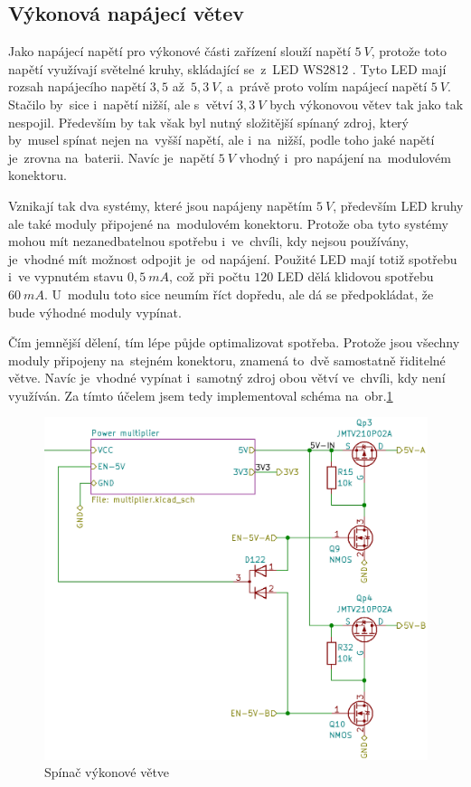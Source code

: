 \subsection{Výkonová napájecí větev}
Jako napájecí napětí pro výkonové části zařízení slouží napětí \(5~V\), protože toto napětí využívají světelné kruhy, skládající se~z~LED WS2812 \cite{WS2812B}.
Tyto LED mají rozsah napájecího napětí \(3,5\) až~\(5,3~V\), a~právě proto volím napájecí napětí \(5~V\).
Stačilo by~sice i~napětí nižší, ale s~větví \(3,3~V\) bych výkonovou větev tak jako tak nespojil.
Především by tak však byl nutný složitější spínaný zdroj, který by~musel spínat nejen na~vyšší napětí, ale i~na~nižší, podle toho jaké napětí je~zrovna na~baterii.
Navíc je~napětí \(5~V\) vhodný i~pro napájení na~modulovém konektoru.

Vznikají tak dva systémy, které jsou napájeny napětím \(5~V\), především LED kruhy ale také moduly připojené na~modulovém konektoru.
Protože oba tyto systémy mohou mít nezanedbatelnou spotřebu i~ve~chvíli, kdy nejsou používány, je~vhodné mít možnost odpojit je~od napájení.
Použité LED mají totiž spotřebu i~ve vypnutém stavu \(0,5~mA\), což při počtu \(120\) LED dělá klidovou spotřebu \(60~mA\).
U~modulu toto sice neumím říct dopředu, ale dá se předpokládat, že bude výhodné moduly vypínat.

Čím jemnější dělení, tím lépe půjde optimalizovat spotřeba.
Protože jsou všechny moduly připojeny na~stejném konektoru, znamená to~dvě samostatně řiditelné větve.
Navíc je~vhodné vypínat i~samotný zdroj obou větví ve~chvíli, kdy není využíván.
Za tímto účelem jsem tedy implementoval schéma na~obr.\ref{fig:spinac_vikonove_vetve}

\begin{figure}[h!]
    \centering
    \includegraphics[width=\textwidth]{text/PraktickaCast/img/spinac_vikonove_vetve.png}
    \caption{Spínač výkonové větve}
    \label{fig:spinac_vikonove_vetve}
\end{figure}

